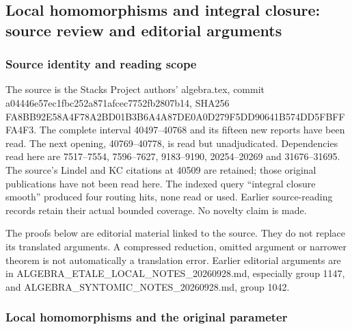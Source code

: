 \subsection{Local homomorphisms and integral closure: source review and editorial arguments}\label{algebra-proof-054-local-homomorphisms-and-integral-closure-source-review-and-editorial-arguments}

\subsubsection{Source identity and reading scope}\label{algebra-proof-054-source-identity-and-reading-scope}

The source is the Stacks Project authors' algebra.tex, commit a044\allowbreak{}46e5\allowbreak{}7ec1\allowbreak{}fbc2\allowbreak{}52a8\allowbreak{}71af\allowbreak{}cec7\allowbreak{}752f\allowbreak{}b280\allowbreak{}7b14, SHA256 FA8B\allowbreak{}B92E\allowbreak{}58A4\allowbreak{}F78A\allowbreak{}2BD0\allowbreak{}1B3B\allowbreak{}6A4A\allowbreak{}87DE\allowbreak{}0A0D\allowbreak{}279F\allowbreak{}5DD9\allowbreak{}0641\allowbreak{}B574\allowbreak{}DD5F\allowbreak{}BFFF\allowbreak{}A4F3. The complete interval 40497--40768 and its fifteen new reports have been read. The next opening, 40769--40778, is read but unadjudicated. Dependencies read here are 7517--7554, 7596--7627, 9183--9190, 20254--20269 and 31676--31695. The source's Lindel and KC citations at 40509 are retained; those original publications have not been read here. The indexed query ``integral closure smooth'' produced four routing hits, none read or used. Earlier source-reading records retain their actual bounded coverage. No novelty claim is made.

The proofs below are editorial material linked to the source. They do not replace its translated arguments. A compressed reduction, omitted argument or narrower theorem is not automatically a translation error. Earlier editorial arguments are in ALGEBRA\_\allowbreak{}ETALE\_\allowbreak{}LOCAL\_\allowbreak{}NOTES\_\allowbreak{}20260928.\allowbreak{}md, especially group 1147, and ALGEBRA\_\allowbreak{}SYNTOMIC\_\allowbreak{}NOTES\_\allowbreak{}20260928.\allowbreak{}md, group 1042.

\subsubsection{Local homomorphisms and the original parameter}\label{algebra-proof-054-local-homomorphisms-and-the-original-parameter}

